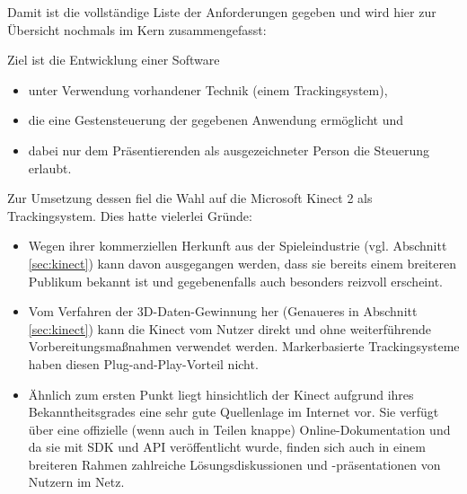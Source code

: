 Damit ist die vollständige Liste der Anforderungen gegeben und wird hier zur Übersicht nochmals im Kern zusammengefasst:\par\medskip
Ziel ist die Entwicklung einer Software
\begin{itemize}
\item unter Verwendung vorhandener Technik (einem Trackingsystem),
\item die eine Gestensteuerung der gegebenen Anwendung ermöglicht und 
\item dabei nur dem Präsentierenden als ausgezeichneter Person die Steuerung erlaubt.
\end{itemize}
Zur Umsetzung dessen fiel die Wahl auf die Microsoft Kinect 2 als Trackingsystem. Dies hatte vielerlei Gründe:
\begin{itemize}
\item Wegen ihrer kommerziellen Herkunft aus der Spieleindustrie (vgl. Abschnitt \ref{sec:kinect}) kann davon ausgegangen werden, dass sie bereits einem breiteren Publikum bekannt ist und gegebenenfalls auch besonders reizvoll erscheint.
\item Vom Verfahren der 3D-Daten-Gewinnung her (Genaueres in Abschnitt \ref{sec:kinect}) kann die Kinect vom Nutzer direkt und ohne weiterführende Vorbereitungsmaßnahmen verwendet werden. Markerbasierte Trackingsysteme haben diesen \glqq{}Plug-and-Play\grqq{}-Vorteil nicht.
\item Ähnlich zum ersten Punkt liegt hinsichtlich der Kinect aufgrund ihres Bekanntheitsgrades eine sehr gute Quellenlage im Internet vor. Sie verfügt über eine offizielle (wenn auch in Teilen knappe) Online-Dokumentation und da sie mit SDK und API veröffentlicht wurde, finden sich auch in einem breiteren Rahmen zahlreiche Lösungsdiskussionen und -präsentationen von Nutzern im Netz.
\end{itemize}
